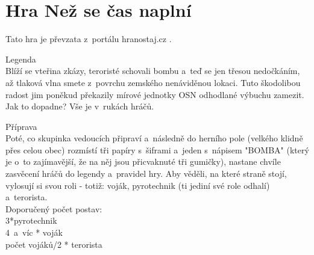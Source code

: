 
\section{Hra Než se čas naplní}
Tato hra je převzata z~portálu hranostaj.cz \cite{NezSeCasNaplni}.

Legenda\\
Blíží se vteřina zkázy, teroristé schovali bombu a~teď se jen třesou nedočkáním, až tlaková vlna smete z~povrchu zemského nenáviděnou lokaci. 
Tuto škodolibou radost jim poněkud překazily mírové jednotky OSN odhodlané výbuchu zamezit. 
Jak to dopadne? 
Vše je v~rukách hráčů.

Příprava\\
Poté, co skupinka vedoucích připraví a~následně do herního pole (velkého klidně přes celou obec) rozmístí tři papíry s~šiframi a~jeden s~nápisem "BOMBA" (který je o~to zajímavější, že na něj jsou přicvaknuté tři gumičky), nastane chvíle zasvěcení hráčů do legendy a~pravidel hry. 
Aby věděli, na které straně stojí, vylosují si svou roli - totiž: voják, pyrotechnik (ti jediní své role odhalí) a~terorista.\\
Doporučený počet postav:\\
3*pyrotechnik\\
4~a~víc * voják\\
počet vojáků/2 * terorista\\

